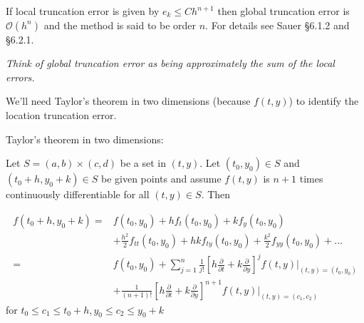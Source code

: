 \documentclass[12pt,letterpaper,noanswers]{exam}
\begin{document}
\begin{tcolorbox}
If local truncation error is given by $e_k \leq Ch^{n+1}$ then global truncation error is $\mathcal{O}(h^n)$ and the method is said to be order $n$.  For details see Sauer \S 6.1.2 and \S 6.2.1.

\emph{Think of global truncation error as being approximately the sum of the local errors.}
\end{tcolorbox}

We'll need Taylor's theorem in two dimensions (because $f(t,y)$) to identify the location truncation error.

\begin{tcolorbox}
Taylor's theorem in two dimensions:

Let $S = (a,b)\times(c,d)$ be a set in $(t,y)$.  Let $(t_0,y_0)\in S$ and $(t_0+h,y_0+k)\in S$ be given points and assume $f(t,y)$ is $n+1$ times continuously differentiable for all $(t,y) \in S$.  Then

\begin{align*}f(t_0+h,y_0+k) =& f(t_0,y_0) + hf_t(t_0,y_0) + kf_y(t_0,y_0) \\
&+ \frac{h^2}{2}f_{tt}(t_0,y_0) + hkf_{ty}(t_0,y_0) + \frac{k^2}{2}f_{yy}(t_0,y_0) + ... \\
= & f(t_0,y_0) + \sum\limits_{j=1}^n \frac{1}{j!}\left[h\frac{\partial}{\partial t} + k\frac{\partial}{\partial y} \right]^j \left.f(t,y)\right\vert_{(t,y) = (t_0,y_0)} \\
&+  \frac{1}{(n+1)!} \left[h\frac{\partial}{\partial t} + k\frac{\partial}{\partial y} \right]^{n+1}\left.f(t,y)\right\vert_{(t,y) = (c_1,c_2)}
\end{align*}
for $t_0 \leq c_1 \leq t_0 +h,y_0\leq c_2\leq y_0+k$
\end{tcolorbox}
\end{document}
